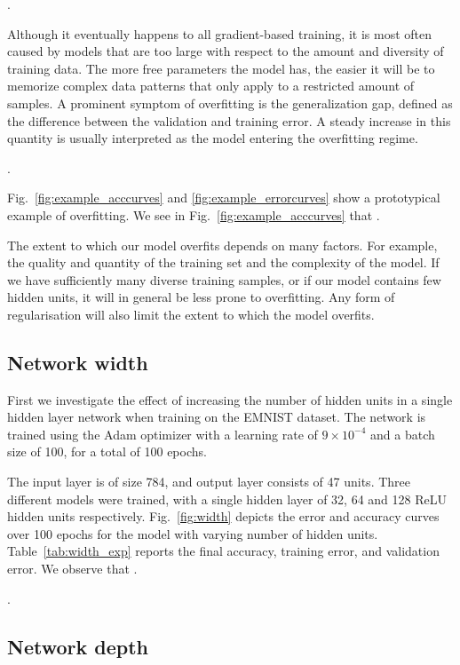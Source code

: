 \documentclass{article}
\begin{document}
\questionFive.

Although it eventually happens to all gradient-based training, it is most often caused by models that are too large with respect to the amount and diversity of training data. The more free parameters the model has, the easier it will be to memorize complex data patterns that only apply to a restricted amount of samples.
A prominent symptom of overfitting is the generalization gap, defined as the difference between the validation and training error. 
A steady increase in this quantity is usually interpreted as the model entering the overfitting regime.

\questionSix.

Fig.~\ref{fig:example_acccurves} and \ref{fig:example_errorcurves} show a prototypical example of overfitting.
We see in Fig.~\ref{fig:example_acccurves} that \questionSeven.

The extent to which our model overfits depends on many factors.
For example, the quality and quantity of the training set and
the complexity of the model. 
If we have sufficiently many diverse training samples,
or if our model contains few hidden units, it will in general
be less prone to overfitting. 
Any form of regularisation will also limit the extent to which the model overfits.


\subsection{Network width}

\questionTableOne
\questionFigureTwo

First we investigate the effect of increasing the number of hidden units in a single hidden layer network when training on the EMNIST dataset.
The network is trained using the Adam optimizer
with a learning rate of $9 \times 10^{-4}$ and a batch size of 100, for a total of 100 epochs.

The input layer is of size 784, and output layer consists of 47 units. 
Three different models were trained, with a single hidden layer of 32, 64 and 128 ReLU hidden units respectively.
Fig.~\ref{fig:width} depicts the error and accuracy curves over 100 epochs for the model with varying number of hidden units.
Table~\ref{tab:width_exp} reports the final accuracy, training error, and validation error.
We observe that \questionEight.

\questionNine.


\subsection{Network depth}
\end{document}

